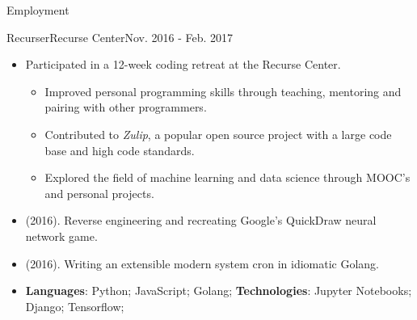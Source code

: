 \documentclass[]{mcdowellcv}
\begin{document}
    \makeheader

    \begin{cvsection}{Employment}

        \begin{cvsubsection}{Recurser}{Recurse Center}{Nov. 2016 - Feb. 2017}
            \begin{itemize}
                \item Participated in a 12-week coding retreat at the Recurse Center.
                \begin{itemize}
                    \item Improved personal programming skills through teaching, mentoring and pairing with other programmers.
                    \item Contributed to \textit{Zulip}, a popular open source project with a large code base and high code standards.
                    \item Explored the field of machine learning and data science through MOOC's and personal projects.
                \end{itemize}
            \end{itemize}
            \begin{itemize}
                \item {} (2016). Reverse engineering and recreating Google's QuickDraw neural network game.
                \item {} (2016). Writing an extensible modern system cron in idiomatic Golang.
            \end{itemize}
            \begin{itemize}
                 \item \textbf{Languages}: Python; JavaScript; Golang; \newline
                \textbf{Technologies}: Jupyter Notebooks; Django; Tensorflow;
            \end{itemize}
        \end{cvsubsection}


\end{cvsection}
\end{document}
